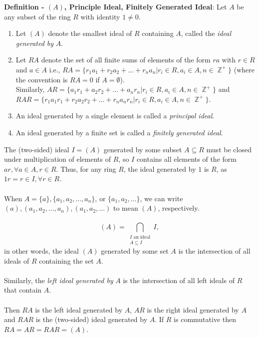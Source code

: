 \documentclass{article}
\DeclareMathOperator{\Z}{\mathbb{Z}}
\begin{document}
\textbf{Definition - $(A)$, Principle Ideal, Finitely Generated Ideal}: Let $A$ be any subset of the ring $R$ with identity $1 \neq 0$. \begin{enumerate}
    \item Let $(A)$ denote the smallest ideal of $R$ containing $A$, called the \textit{ideal generated by} $A$.
    \item Let $RA$ denote the set of all finite sums of elements of the form $ra$ with $r \in R$ and $a \in A$ i.e., $RA = \{r_1a_1 + r_2a_2 + \dots + r_n a_n | r_i \in R, a_i \in A, n \in \Z^+\}$ (where the convention is $RA = 0$ if $A = \emptyset$). \\
    Similarly, $AR = \{a_1 r_1 + a_2 r_2 + \dots + a_n r_n | r_i \in R, a_i \in A, n \in \Z^+\}$ and $RAR = \{r_1 a_1 r_1 + r_2 a_2 r_2 + \dots + r_n a_n r_n | r_i \in R, a_i \in A, n \in \Z^+\}$. 
    \item An ideal generated by a single element is called a \textit{principal ideal}.
    \item An ideal generated by a finite set is called a \textit{finitely generated ideal}.
\end{enumerate} $ $ \\
The (two-sided) ideal $I = (A)$ generated by some subset $A \subseteq R$ must be closed under multiplication of elements of $R$, so $I$ contains all elements of the form $ar, \forall a \in A, r \in R$. Thus, for any ring $R$, the ideal generated by $1$ is $R$, as $1r = r \in I, \forall r \in R$. \\ \\
When $A = \{a\}, \{a_1, a_2, \dots, a_n\}$, or $\{a_1, a_2, \dots\}$, we can write $(a), (a_1, a_2, \dots, a_n), (a_1, a_2, \dots)$ to mean $(A)$, respectively. \\ \\
$$(A) = \bigcap_{\substack{I \text{ an ideal} \\ A \subseteq I}} I,$$ in other words, the ideal $(A)$ generated by some set $A$ is the intersection of all ideals of $R$ containing the set $A$. \\ \\
Similarly, the \textit{left ideal generated by} $A$ is the intersection of all left ideals of $R$ that contain $A$. \\ \\
Then $RA$ is the left ideal generated by $A$, $AR$ is the right ideal generated by $A$ and $RAR$ is the (two-sided) ideal generated by $A$. If $R$ is commutative then $RA = AR = RAR = (A)$. \\ \\
\end{document}
